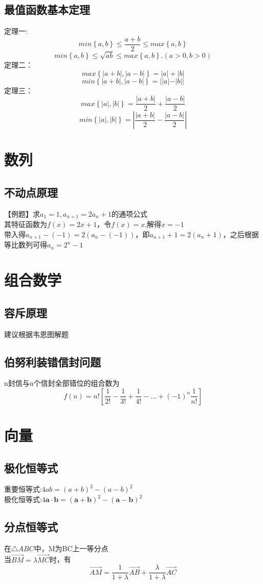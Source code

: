 \documentclass[UTF8]{ctexart}
\begin{document}
		\subsection{最值函数基本定理}
			定理一:
			\[min\left\{a,b\right\}\leq\frac{a+b}{2}\leq max\left\{a,b\right\}\]
			\[min\left\{a,b\right\}\leq\sqrt{ab}\leq max\left\{a,b\right\}.(a>0,b>0)\]
			\indent 定理二：
			\[max\left\{\left|a+b\right|,\left|a-b\right| \right\}=|a|+|b|\]
			\[min\left\{\left|a+b\right|,\left|a-b\right| \right\}=||a|-|b||\]
			\indent 定理三：
			\[max\left\{|a|,|b|\right\}=\frac{|a+b|}{2}+\frac{|a-b|}{2}\]
			\[min\left\{|a|,|b|\right\}=\left|\frac{|a+b|}{2}-\frac{|a-b|}{2}\right|\]
	\section{数列}
		\subsection{不动点原理}
			【例题】求$a_1 = 1 , a_{n+1}=2a_n +1$的通项公式\\
			其特征函数为$f(x)=2x+1$，令$f(x)=x$,解得$x=-1$\\
			带入得$a_{n+1}-(-1)=2(a_n-(-1))$，即$a_{n+1}+1=2(a_n+1)$，之后根据等比数列可得$a_n=2^n -1$
	\section{组合数学}
		\subsection{容斥原理}
			建议根据韦恩图解题
		\subsection{伯努利装错信封问题}
			n封信与n个信封全部错位的组合数为
			\[f(n)=n!\left[ \frac{1}{2!}-\frac{1}{3!}+\frac{1}{4!}-\dots +(-1)^n \frac{1}{n!} \right] \]
	\section{向量}
		\subsection{极化恒等式}
			重要恒等式:$4ab=(a+b)^2-(a-b)^2$\\
			\indent 极化恒等式:$4\boldsymbol{a}\cdot \boldsymbol{b}=(\boldsymbol{a}+\boldsymbol{b})^2-(\boldsymbol{a}-\boldsymbol{b})^2$
		\subsection{分点恒等式}
			在$\triangle ABC$中，M为BC上一等分点\\
			\indent 当$\overrightarrow{BM}=\lambda \overrightarrow{MC}时$，有
			\[\overrightarrow{AM}=\frac{1}{1+\lambda}\overrightarrow{AB}+\frac{\lambda}{1+\lambda}\overrightarrow{AC}\]
\end{document}
